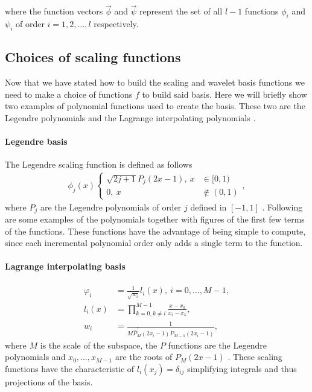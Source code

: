\documentclass[../Thesis.tex]{subfiles}
\begin{document}
where the function vectors $\vec{\phi}$ and $\vec{\psi}$ represent the set of
all $l-1$ functions $\phi_i$ and $\psi_i$ of order $i = 1, 2, ..., l$ respectively.

\subsection{Choices of scaling functions }
Now that we have stated how to build the scaling and wavelet basis functions
we need to make a choice of functions $f$ to build said basis.
Here we will briefly show two examples of polynomial functions used to create the
basis. These two are the Legendre polynomials and the Lagrange interpolating
polynomials \cite{Beylkin:MRA, Beylkin1999AdaptiveSO}.

\paragraph{Legendre basis}
The Legendre scaling function is defined as follows
\begin{align}
  \phi_j(x)
  \begin{cases}
    \sqrt{2j+1} P_j(2x-1), \ x&\in [0,1)\\
    0,\ x&\notin (0, 1)
  \end{cases},
\end{align}
where $P_j$ are the Legendre polynomials of order $j$ defined in $[-1, 1]$ \cite{Beylkin:MRA}.
Following are some examples of the polynomials together with figures of the first few terms
of the functions. These functions have the advantage of being simple to compute,
since each incremental polynomial order only adds a single term to the function.

\paragraph{Lagrange interpolating basis}
  \begin{align}
    \varphi_i &= \frac{1}{\sqrt{w_i}}l_i(x), \ i = 0, ..., M-1,\\
    l_i(x) &= \prod^{M-1}_{k = 0, k\neq i} \frac{x-x_k}{x_i-x_k}, \\
    w_i &= \frac{1}{M\hat{P}^\prime_M(2x_i-1)P_{M-1}(2x_i-1)},
  \end{align}
where $M$ is the scale of the subspace, the $P$ functions are the Legendre polynomials and
$x_0, ..., x_{M-1}$ are the roots of $P_M(2x-1)$ \cite{Beylkin:MRA}.
These scaling functions have the characteristic of $l_i(x_j)=\delta_{ij}$ simplifying
integrals and thus projections of the basis.
\end{document}
